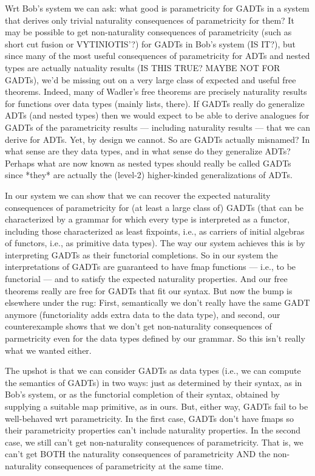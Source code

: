 \documentclass[acmsmall,screen,review,anonymous]{acmart}
\theoremstyle{definition}
\begin{document}
Wrt Bob's system we can ask: what good is parametricity for GADTs in a
system that derives only trivial naturality consequences of
parametricity for them? It may be possible to get non-naturality
consequences of parametricity (such as short cut fusion or
VYTINIOTIS'?) for GADTs in Bob's system (IS IT?), but since many of
the most useful consequences of parametricity for ADTs and nested
types are actually natuality results (IS THIS TRUE? MAYBE NOT FOR
GADTs), we'd be missing out on a very large class of expected and
useful free theorems. Indeed, many of Wadler's free theorems are
precisely naturality results for functions over data types (mainly
lists, there). If GADTs really do generalize ADTs (and nested types)
then we would expect to be able to derive analogues for GADTs of the
parametricity results --- including naturality results --- that we can
derive for ADTs. Yet, by design we cannot. So are GADTs actually
misnamed? In what sense are they data types, and in what sense do they
generalize ADTs? Perhaps what are now known as nested types should
really be called GADTs since *they* are actually the (level-2)
higher-kinded generalizations of ADTs.

In our system we can show that we can recover the expected naturality
consequences of parametricity for (at least a large class of) GADTs
(that can be characterized by a grammar for which every type is
interpreted as a functor, including those characterized as least
fixpoints, i.e., as carriers of initial algebras of functors, i.e., as
primitive data types). The way our system achieves this is by
interpreting GADTs as their functorial completions. So in our system
the interpretations of GADTs are guaranteed to have fmap functions ---
i.e., to be functorial --- and to satisfy the expected naturality
properties. And our free theorems really are free for GADTs that fit
our syntax. But now the bump is elsewhere under the rug: First,
semantically we don't really have the same GADT anymore (functoriality
adds extra data to the data type), and second, our counterexample
shows that we don't get non-naturality consequences of parmetricity
even for the data types defined by our grammar.  So this isn't really
what we wanted either.


The upshot is that we can consider GADTs as data types (i.e., we can
compute the semantics of GADTs) in two ways: just as determined by
their syntax, as in Bob's system, or as the functorial completion of
their syntax, obtained by supplying a suitable map primitive, as in
ours. But, either way, GADTs fail to be well-behaved wrt
parametricity. In the first case, GADTs don't have fmaps so their
parametricity properties can't include naturality properties. In the
second case, we still can't get non-naturality consequences of
parametricity. That is, we can't get BOTH the naturality consequences
of parametricity AND the non-naturality consequences of parametricity
at the same time.
\end{document}
